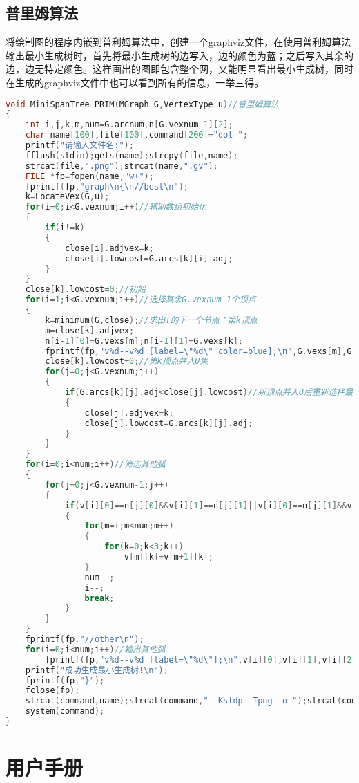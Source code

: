 \documentclass{DateStructure}
\begin{document}
\subsection{普里姆算法}
将绘制图的程序内嵌到普利姆算法中，创建一个graphviz文件，在使用普利姆算法输出最小生成树时，首先将最小生成树的边写入，边的颜色为蓝；之后写入其余的边，边无特定颜色。这样画出的图即包含整个网，又能明显看出最小生成树，同时在生成的graphviz文件中也可以看到所有的信息，一举三得。
\begin{lstlisting}[language=c,caption={MiniSpanTree\_PRIM}]
void MiniSpanTree_PRIM(MGraph G,VertexType u)//普里姆算法
{
    int i,j,k,m,num=G.arcnum,n[G.vexnum-1][2];
    char name[100],file[100],command[200]="dot ";
    printf("请输入文件名:");
    fflush(stdin);gets(name);strcpy(file,name);
    strcat(file,".png");strcat(name,".gv");
    FILE *fp=fopen(name,"w+");
    fprintf(fp,"graph\n{\n//best\n");
    k=LocateVex(G,u);
    for(i=0;i<G.vexnum;i++)//辅助数组初始化
    {
        if(i!=k)
        {
            close[i].adjvex=k;
            close[i].lowcost=G.arcs[k][i].adj;
        }
    }
    close[k].lowcost=0;//初始
    for(i=1;i<G.vexnum;i++)//选择其余G.vexnum-1个顶点
    {
        k=minimum(G,close);//求出T的下一个节点：第k顶点
        m=close[k].adjvex;
        n[i-1][0]=G.vexs[m];n[i-1][1]=G.vexs[k];
        fprintf(fp,"v%d--v%d [label=\"%d\" color=blue];\n",G.vexs[m],G.vexs[k],G.arcs[m][k].adj);//输出生成树的边
        close[k].lowcost=0;//第k顶点并入U集
        for(j=0;j<G.vexnum;j++)
        {
            if(G.arcs[k][j].adj<close[j].lowcost)//新顶点并入U后重新选择最小边
            {
                close[j].adjvex=k;
                close[j].lowcost=G.arcs[k][j].adj;
            }
        }
    }
    for(i=0;i<num;i++)//筛选其他弧
    {
        for(j=0;j<G.vexnum-1;j++)
        {
            if(v[i][0]==n[j][0]&&v[i][1]==n[j][1]||v[i][0]==n[j][1]&&v[i][1]==n[j][0])
            {
                for(m=i;m<num;m++)
                {
                    for(k=0;k<3;k++)
                        v[m][k]=v[m+1][k];
                }
                num--;
                i--;
                break;
            }
        }
    }
    fprintf(fp,"//other\n");
    for(i=0;i<num;i++)//输出其他弧
        fprintf(fp,"v%d--v%d [label=\"%d\"];\n",v[i][0],v[i][1],v[i][2]);
    printf("成功生成最小生成树!\n");
    fprintf(fp,"}");
    fclose(fp);
    strcat(command,name);strcat(command," -Ksfdp -Tpng -o ");strcat(command,file);
    system(command);
}
\end{lstlisting}

\section{用户手册}
\end{document}

